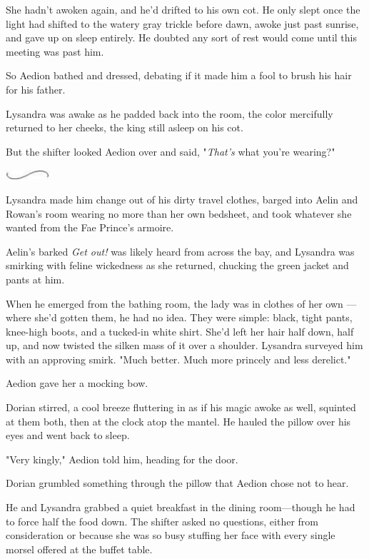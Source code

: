 She hadn't awoken again, and he'd drifted to his own cot. He only slept once the light had shifted to the watery gray trickle before dawn, awoke just past sunrise, and gave up on sleep entirely. He doubted any sort of rest would come until this meeting was past him.

So Aedion bathed and dressed, debating if it made him a fool to brush his hair for his father.

Lysandra was awake as he padded back into the room, the color mercifully returned to her cheeks, the king still asleep on his cot.

But the shifter looked Aedion over and said, "\emph{That's} what you're wearing?"

\includegraphics[width=0.65in,height=0.13in]{images/seperator}

Lysandra made him change out of his dirty travel clothes, barged into Aelin and Rowan's room wearing no more than her own bedsheet, and took whatever she wanted from the Fae Prince's armoire.

Aelin's barked \emph{Get out!} was likely heard from across the bay, and Lysandra was smirking with feline wickedness as she returned, chucking the green jacket and pants at him.

When he emerged from the bathing room, the lady was in clothes of her own ---where she'd gotten them, he had no idea. They were simple: black, tight pants, knee-high boots, and a tucked-in white shirt. She'd left her hair half down, half up, and now twisted the silken mass of it over a shoulder. Lysandra surveyed him with an approving smirk. "Much better. Much more princely and less  derelict."

Aedion gave her a mocking bow.

Dorian stirred, a cool breeze fluttering in as if his magic awoke as well, squinted at them both, then at the clock atop the mantel. He hauled the pillow over his eyes and went back to sleep.

"Very kingly," Aedion told him, heading for the door.

Dorian grumbled something through the pillow that Aedion chose not to hear.

He and Lysandra grabbed a quiet breakfast in the dining room---though he had to force half the food down. The shifter asked no questions, either from consideration or because she was so busy stuffing her face with every single morsel offered at the buffet table.

